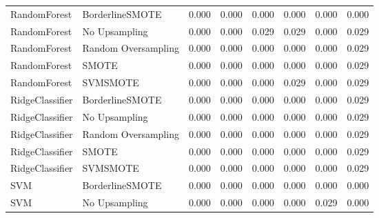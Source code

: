 \begin{tabular}{llllllll}
                RandomForest &     BorderlineSMOTE & 0.000 &                     0.000 &                 0.000 &                  0.000 &                                   0.000 &     0.000 \\
                RandomForest &       No Upsampling & 0.000 &                     0.000 &                 0.029 &                  0.029 &                                   0.000 &     0.029 \\
                RandomForest & Random Oversampling & 0.000 &                     0.000 &                 0.000 &                  0.000 &                                   0.000 &     0.029 \\
                RandomForest &               SMOTE & 0.000 &                     0.000 &                 0.000 &                  0.000 &                                   0.000 &     0.029 \\
                RandomForest &            SVMSMOTE & 0.000 &                     0.000 &                 0.000 &                  0.029 &                                   0.000 &     0.029 \\
             RidgeClassifier &     BorderlineSMOTE & 0.000 &                     0.000 &                 0.000 &                  0.000 &                                   0.000 &     0.029 \\
             RidgeClassifier &       No Upsampling & 0.000 &                     0.000 &                 0.000 &                  0.000 &                                   0.000 &     0.029 \\
             RidgeClassifier & Random Oversampling & 0.000 &                     0.000 &                 0.000 &                  0.000 &                                   0.000 &     0.029 \\
             RidgeClassifier &               SMOTE & 0.000 &                     0.000 &                 0.000 &                  0.000 &                                   0.000 &     0.029 \\
             RidgeClassifier &            SVMSMOTE & 0.000 &                     0.000 &                 0.000 &                  0.000 &                                   0.000 &     0.029 \\
                         SVM &     BorderlineSMOTE & 0.000 &                     0.000 &                 0.000 &                  0.000 &                                   0.000 &     0.000 \\
                         SVM &       No Upsampling & 0.000 &                     0.000 &                 0.000 &                  0.000 &                                   0.029 &     0.000 \\

\end{tabular}
